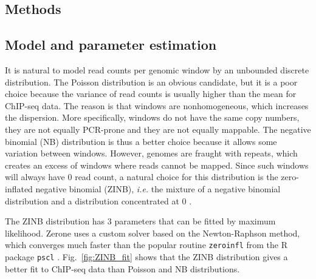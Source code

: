 \documentclass{bioinfo}
\begin{document}
\begin{methods}
\section{Methods}

\subsection{Model and parameter estimation}
\label{sub:hmm}
It is natural to model read counts per genomic window by an unbounded
discrete distribution. The Poisson distribution is an obvious candidate,
but it is a poor choice because the variance of read counts is usually
higher than the mean for ChIP-seq data. The reason is that windows
are nonhomogeneous, which increases the dispersion. More specifically,
windows do not have the same copy numbers, they are not equally PCR-prone
and they are not equally mappable.
The negative binomial (NB) distribution is thus a better choice
because it allows some variation between windows. However, genomes
are fraught with repeats, which creates an excess of windows where
reads cannot be mapped. Since such windows will always have 0 read
count, a natural choice for this distribution is the zero-inflated
negative binomial (ZINB), \textit{i.e.} the mixture of a negative
binomial distribution and a distribution concentrated at 0
\citep{pmid21787385}.

The ZINB distribution has 3 parameters that can be fitted by maximum
likelihood. Zerone uses a custom solver based on the Newton-Raphson
method, which converges much faster than the popular routine
\texttt{zeroinfl} \citep{psclb} from the R package
\texttt{pscl} \citep{R,pscla}. Fig.~\ref{fig:ZINB_fit} shows that the
ZINB distribution gives a better fit to ChIP-seq data than Poisson
and NB distributions.


\end{methods}
\end{document}
